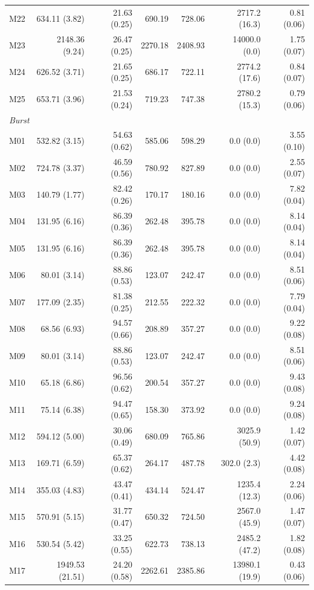 \documentclass[11pt]{article}
\theoremstyle{remark}
\begin{document}
\begin{longtable}{lrrrrrr}
M22 & 634.11 (3.82) & 21.63 (0.25) & 690.19 & 728.06 & 2717.2 (16.3) & 0.81 (0.06) \\
M23 & 2148.36 (9.24) & 26.47 (0.25) & 2270.18 & 2408.93 & 14000.0 (0.0) & 1.75 (0.07) \\
M24 & 626.52 (3.71) & 21.65 (0.25) & 686.17 & 722.11 & 2774.2 (17.6) & 0.84 (0.07) \\
M25 & 653.71 (3.96) & 21.53 (0.24) & 719.23 & 747.38 & 2780.2 (15.3) & 0.79 (0.06) \\
\multicolumn{7}{l}{\textit{Burst}} \\
M01 & 532.82 (3.15) & 54.63 (0.62) & 585.06 & 598.29 & 0.0 (0.0) & 3.55 (0.10) \\
M02 & 724.78 (3.37) & 46.59 (0.56) & 780.92 & 827.89 & 0.0 (0.0) & 2.55 (0.07) \\
M03 & 140.79 (1.77) & 82.42 (0.26) & 170.17 & 180.16 & 0.0 (0.0) & 7.82 (0.04) \\
M04 & 131.95 (6.16) & 86.39 (0.36) & 262.48 & 395.78 & 0.0 (0.0) & 8.14 (0.04) \\
M05 & 131.95 (6.16) & 86.39 (0.36) & 262.48 & 395.78 & 0.0 (0.0) & 8.14 (0.04) \\
M06 & 80.01 (3.14) & 88.86 (0.53) & 123.07 & 242.47 & 0.0 (0.0) & 8.51 (0.06) \\
M07 & 177.09 (2.35) & 81.38 (0.25) & 212.55 & 222.32 & 0.0 (0.0) & 7.79 (0.04) \\
M08 & 68.56 (6.93) & 94.57 (0.66) & 208.89 & 357.27 & 0.0 (0.0) & 9.22 (0.08) \\
M09 & 80.01 (3.14) & 88.86 (0.53) & 123.07 & 242.47 & 0.0 (0.0) & 8.51 (0.06) \\
M10 & 65.18 (6.86) & 96.56 (0.62) & 200.54 & 357.27 & 0.0 (0.0) & 9.43 (0.08) \\
M11 & 75.14 (6.38) & 94.47 (0.65) & 158.30 & 373.92 & 0.0 (0.0) & 9.24 (0.08) \\
M12 & 594.12 (5.00) & 30.06 (0.49) & 680.09 & 765.86 & 3025.9 (50.9) & 1.42 (0.07) \\
M13 & 169.71 (6.59) & 65.37 (0.62) & 264.17 & 487.78 & 302.0 (2.3) & 4.42 (0.08) \\
M14 & 355.03 (4.83) & 43.47 (0.41) & 434.14 & 524.47 & 1235.4 (12.3) & 2.24 (0.06) \\
M15 & 570.91 (5.15) & 31.77 (0.47) & 650.32 & 724.50 & 2567.0 (45.9) & 1.47 (0.07) \\
M16 & 530.54 (5.42) & 33.25 (0.55) & 622.73 & 738.13 & 2485.2 (47.2) & 1.82 (0.08) \\
M17 & 1949.53 (21.51) & 24.20 (0.58) & 2262.61 & 2385.86 & 13980.1 (19.9) & 0.43 (0.06) \\

\end{longtable}
\end{document}
